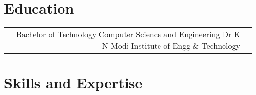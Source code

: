 \documentclass[10pt]{article} %
\begin{document}
\begin{paracol}{2}
\section{Education} 





\begin{supertabular}{rl} %

	
	{Bachelor of Technology} %
	{} %
	{Computer Science and Engineering} %
    {Dr K N Modi Institute of Engg \& Technology} %
	
	
\end{supertabular}


\section{Skills and Expertise} 





\begin{supertabular}{rl} %
	

\end{supertabular}
\end{paracol}
\end{document}
